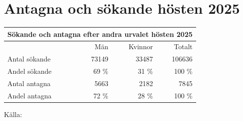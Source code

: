 \documentclass[a4paper, 10pt]{article}
\begin{document}


\printbibliography[heading=bibintoc]

\clearpage




\appendix

\section{Antagna och sökande hösten 2025}
\label{app:antagna}

\begin{center}
\begin{tabular}{|l|rrr|}    
    \multicolumn{4}{c}{Sökande och antagna efter andra urvalet hösten 2025}\\
    \hline
                    & Män   & Kvinnor   & Totalt\\ \hline
    Antal sökande   & 73149 & 33487     & 106636\\
    Andel sökande   & 69 \% & 31 \%     & 100 \%\\ \hline
    Antal antagna   & 5663  & 2182      & 7845\\
    Andel antagna   & 72 \% & 28 \%     & 100 \% \\ \hline
\end{tabular}

Källa: \parencite{uhrantagna2026}
\end{center}
\end{document}
